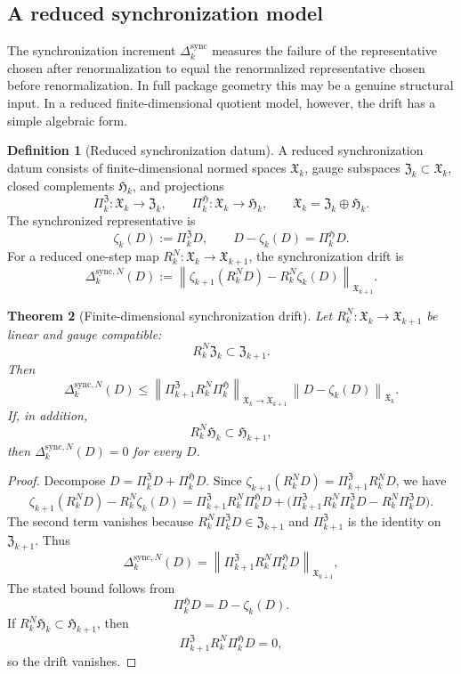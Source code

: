 \documentclass[11pt]{article}
\numberwithin{equation}{section}
\theoremstyle{plain}
\newtheorem{theorem}{Theorem}[section]
\theoremstyle{definition}
\newtheorem{definition}[theorem]{Definition}
\theoremstyle{remark}
\newcommand{\sync}{\mathrm{sync}}
\newcommand{\norm}[1]{\left\lVert #1\right\rVert}
\begin{document}
\subsection{A reduced synchronization model}

The synchronization increment \(\Delta_k^{\sync}\) measures the failure of
the representative chosen after renormalization to equal the renormalized
representative chosen before renormalization.  In full package geometry this
may be a genuine structural input.  In a reduced finite-dimensional quotient
model, however, the drift has a simple algebraic form.

\begin{definition}[Reduced synchronization datum]\label{def:sync-datum}
A reduced synchronization datum consists of finite-dimensional normed spaces
\(\mathfrak X_k\), gauge subspaces \(\mathfrak Z_k\subset\mathfrak X_k\),
closed complements \(\mathfrak H_k\), and projections
\[
  \Pi_k^{\mathfrak Z}:\mathfrak X_k\to\mathfrak Z_k,
  \qquad
  \Pi_k^{\mathfrak H}:\mathfrak X_k\to\mathfrak H_k,
  \qquad
  \mathfrak X_k=\mathfrak Z_k\oplus\mathfrak H_k.
\]
The synchronized representative is
\[
  \zeta_k(D):=\Pi_k^{\mathfrak Z}D,
  \qquad
  D-\zeta_k(D)=\Pi_k^{\mathfrak H}D.
\]
For a reduced one-step map \(R_k^N:\mathfrak X_k\to\mathfrak X_{k+1}\), the
synchronization drift is
\[
  \Delta_{k}^{\sync,N}(D)
  :=
  \norm{\zeta_{k+1}(R_k^ND)-R_k^N\zeta_k(D)}_{\mathfrak X_{k+1}}.
\]
\end{definition}

\begin{theorem}[Finite-dimensional synchronization drift]\label{thm:sync-drift}
Let \(R_k^N:\mathfrak X_k\to\mathfrak X_{k+1}\) be linear and gauge
compatible:
\[
  R_k^N\mathfrak Z_k\subset \mathfrak Z_{k+1}.
\]
Then
\[
  \Delta_{k}^{\sync,N}(D)
  \le
  \norm{\Pi_{k+1}^{\mathfrak Z}R_k^N\Pi_k^{\mathfrak H}}_{\mathfrak X_k\to
  \mathfrak X_{k+1}}
  \,
  \norm{D-\zeta_k(D)}_{\mathfrak X_k}.
\]
If, in addition,
\[
  R_k^N\mathfrak H_k\subset\mathfrak H_{k+1},
\]
then \(\Delta_{k}^{\sync,N}(D)=0\) for every \(D\).
\end{theorem}

\begin{proof}
Decompose \(D=\Pi_k^{\mathfrak Z}D+\Pi_k^{\mathfrak H}D\).  Since
\(\zeta_{k+1}(R_k^ND)=\Pi_{k+1}^{\mathfrak Z}R_k^ND\), we have
\[
  \zeta_{k+1}(R_k^ND)-R_k^N\zeta_k(D)
  =
  \Pi_{k+1}^{\mathfrak Z}R_k^N\Pi_k^{\mathfrak H}D
  +
  \bigl(\Pi_{k+1}^{\mathfrak Z}R_k^N\Pi_k^{\mathfrak Z}D
  -
  R_k^N\Pi_k^{\mathfrak Z}D\bigr).
\]
The second term vanishes because \(R_k^N\Pi_k^{\mathfrak Z}D\in
\mathfrak Z_{k+1}\) and \(\Pi_{k+1}^{\mathfrak Z}\) is the identity on
\(\mathfrak Z_{k+1}\).  Thus
\[
  \Delta_{k}^{\sync,N}(D)
  =
  \norm{\Pi_{k+1}^{\mathfrak Z}R_k^N\Pi_k^{\mathfrak H}D}_{\mathfrak X_{k+1}},
\]
The stated bound follows from
\[
  \Pi_k^{\mathfrak H}D=D-\zeta_k(D).
\]
If \(R_k^N\mathfrak H_k\subset\mathfrak H_{k+1}\), then
\[
  \Pi_{k+1}^{\mathfrak Z}R_k^N\Pi_k^{\mathfrak H}D=0,
\]
so the drift vanishes.
\end{proof}
\end{document}
